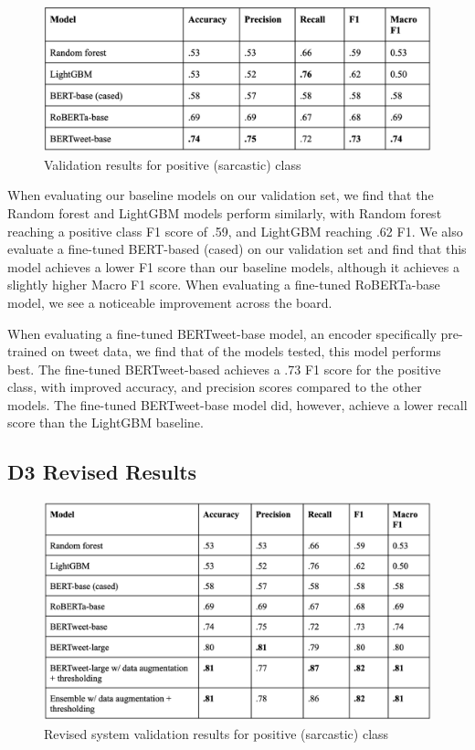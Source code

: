 \documentclass[11pt]{article}
\begin{document}
\begin{figure}[h!]
    \includegraphics[width=.5\textwidth]{Picture3}
    \caption{Validation results for positive (sarcastic) class}
\end{figure}

When evaluating our baseline models on our validation set, we find that the Random forest and LightGBM models perform similarly, with Random forest reaching a positive class F1 score of .59, and LightGBM reaching .62 F1. We also evaluate a fine-tuned BERT-based (cased) on our validation set and find that this model achieves a lower F1 score than our baseline models, although it achieves a slightly higher Macro F1 score. When evaluating a fine-tuned RoBERTa-base model, we see a noticeable improvement across the board. 

When evaluating a fine-tuned BERTweet-base model, an encoder specifically pre-trained on tweet data, we find that of the models tested, this model performs best. The fine-tuned BERTweet-based achieves a .73 F1 score for the positive class, with improved accuracy, and precision scores compared to the other models. The fine-tuned BERTweet-base model did, however, achieve a lower recall score than the LightGBM baseline.

\subsection{D3 Revised Results}
\begin{figure}[h!]
    \includegraphics[width=.5\textwidth]{Picture9.png}
    \caption{Revised system validation results for positive (sarcastic) class}
\end{figure}
\end{document}
